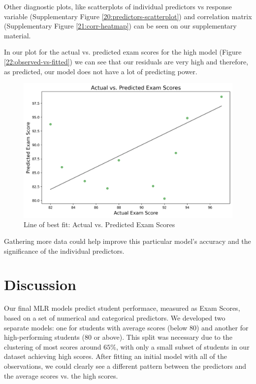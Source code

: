 \documentclass[twocolumn]{article} %
\begin{document}
Other diagnostic plots, like scatterplots of individual predictors vs response variable (Supplementary Figure \ref{20:predictors-scatterplot}) and correlation matrix (Supplementary Figure \ref{21:corr-heatmap}) can be seen on our supplementary material.

In our plot for the actual vs. predicted exam scores for the high model (Figure \ref{22:observed-vs-fitted}) we can see that our residuals are very high and therefore, as predicted, our model does not have a lot of predicting power.

\begin{figure}[H]
  \includegraphics[width=\columnwidth]{22-observed-vs-fitted.png}
  \caption{Line of best fit: Actual vs. Predicted Exam Scores}
  \label{22:oberserved-vs-fitted}
\end{figure}

Gathering more data could help improve this particular model's accuracy and the significance of the individual predictors.

\section{Discussion}

Our final MLR models predict student performace, measured as Exam Scores, based on a set of numerical and categorical predictors. We developed two separate models: one for students with average scores (below $80$) and another for high-performing students ($80$ or above). This split was necessary due to the clustering of most scores around $65\%$, with only a small subset of students in our dataset achieving high scores. After fitting an initial model with all of the observations, we could clearly see a different pattern between the predictors and the average scores vs. the high scores.
\end{document}
